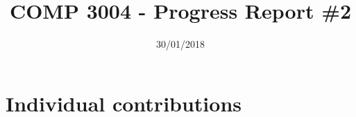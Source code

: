 \documentclass[10pt,a4paper]{article}
\title{COMP 3004 - Progress Report \#2}
\author{}
\date{30/01/2018}
\begin{document}


\section*{Individual contributions}




\end{document}
